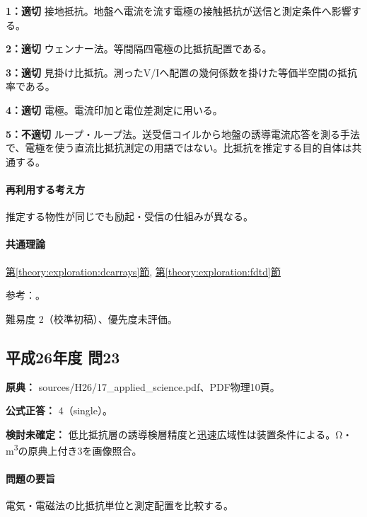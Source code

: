 \noindent\textbf{1：適切} 接地抵抗。地盤へ電流を流す電極の接触抵抗が送信と測定条件へ影響する。\par

\noindent\textbf{2：適切} ウェンナー法。等間隔四電極の比抵抗配置である。\par

\noindent\textbf{3：適切} 見掛け比抵抗。測ったV/Iへ配置の幾何係数を掛けた等価半空間の抵抗率である。\par

\noindent\textbf{4：適切} 電極。電流印加と電位差測定に用いる。\par

\noindent\textbf{5：不適切} ループ・ループ法。送受信コイルから地盤の誘導電流応答を測る手法で、電極を使う直流比抵抗測定の用語ではない。比抵抗を推定する目的自体は共通する。\par

\paragraph{再利用する考え方} 推定する物性が同じでも励起・受信の仕組みが異なる。

\paragraph{共通理論} \hyperref[theory:exploration:dcarrays]{第\ref*{theory:exploration:dcarrays}節}, \hyperref[theory:exploration:fdtd]{第\ref*{theory:exploration:fdtd}節}

\par 参考：\cite{epa_resistivity,epa_fdem}。

\par 難易度 2（校準初稿）、優先度未評価。

\subsection{平成26年度 問23}
\label{q:h26-reg-applied-23}

\noindent\textbf{原典：} sources/H26/17\_applied\_science.pdf、PDF物理10頁。

\textbf{公式正答：} 4（single）。

\par\textbf{検討未確定：} 低比抵抗層の誘導検層精度と迅速広域性は装置条件による。Ω・m\textsuperscript{3}の原典上付き3を画像照合。

\paragraph{問題の要旨} 電気・電磁法の比抵抗単位と測定配置を比較する。

